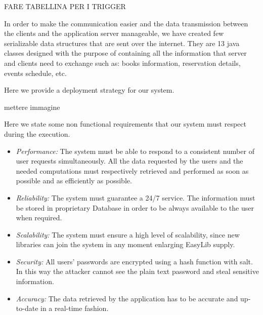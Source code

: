 \color{red} FARE TABELLINA PER I TRIGGER
\color{black}

In order to make the communication easier and the data transmission between the clients and the application server manageable, we have created few serializable data structures that are sent over the internet. They are 13 java classes designed with the purpose of containing all the information that server and clients need to exchange such as: books information, reservation details, events schedule, etc. 

Here we provide a deployment strategy for our system.

\color{red} mettere immagine
\color{black}

Here we state some non functional requirements that our system must respect during the execution.

\begin{itemize}
\item \emph{Performance:} The system must be able to respond to a consistent number of user requests simultaneously. All the data requested by the users and the needed computations must respectively retrieved and performed as soon as possible and as efficiently as possible.

\item \emph{Reliability:} The system must guarantee a 24/7 service. The information must be stored in proprietary Database in order to be always available to the user when required.
\item \emph{Scalability:} The system must ensure a high level of scalability, since new libraries can join the system in any moment enlarging EasyLib supply.
\item \emph{Security:} All users’ passwords are encrypted using a hash function with salt. In this way the attacker cannot see the plain text password and steal sensitive information.

\item \emph{Accuracy:} The data retrieved by the application has to be accurate and up-to-date in a real-time fashion.
\end{itemize}